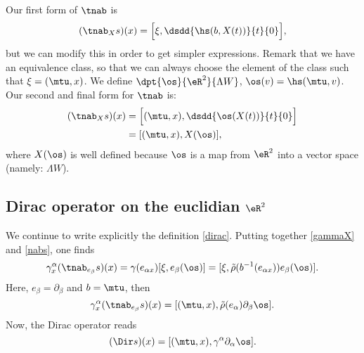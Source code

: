 Our first form of $\tnab$ is
\[
	(\tnab_Xs)(x)=\Big[\xi,\dsdd{\hs(b,X(t))}{t}{0}\Big],
\]
but we can modify this in order to get simpler expressions. Remark that we have an equivalence class, so that we can always choose the element of the class such that $\xi=(\mtu,x)$. We define $\dpt{\os}{\eR^2}{\Lambda W }$, $\os(v)=\hs(\mtu,v)$. Our second and final form for $\tnab$ is:
\begin{subequations}
	\begin{align}
		(\tnab_Xs)(x) & =\Big[(\mtu,x),\dsdd{\os(X(t))}{t}{0}\Big] \\\label{nabs}
		              & =[(\mtu,x),X(\os)],
	\end{align}
\end{subequations}
where $X(\os)$ is well defined because $\os$ is a map from $\eR^2$ into a vector space (namely: $\Lambda W $).

\subsection{Dirac operator on the euclidian \texorpdfstring{$\eR^2$}{R2}}

We continue to write explicitly the definition \eqref{dirac}. Putting together \eqref{gammaX} and \eqref{nabs}, one finds
\begin{equation}
	\gamma^{\alpha}_x(\tnab_{e_{\beta}}s)(x)	=\gamma(e_{\alpha x})[\xi,e_{\beta}(\os)]
	=[\xi,\tilde\rho(b^{-1}(e_{\alpha x}))e_{\beta}(\os)].
\end{equation}
Here, $e_{\beta}=\partial_{\beta}$ and $b=\mtu$, then
\[
	\gamma^{\alpha}_x(\tnab_{e_{\beta}}s)(x)=[(\mtu,x),\tilde\rho(e_{\alpha})\partial_{\beta}\os].
\]
Now, the Dirac operator reads
\[
	(\Dir s)(x)=[(\mtu,x),\gamma^{\alpha}\partial_{\alpha}\os].
\]

